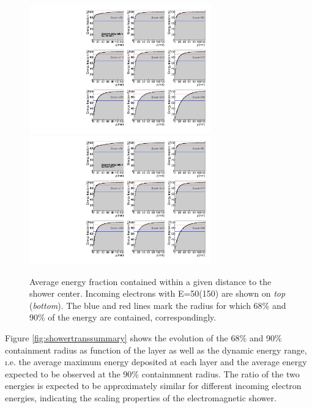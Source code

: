 \begin{figure}[h!]
  \begin{center}
    \includegraphics[width=0.7\textwidth]{figures/cfracsensorenhitsvsrE50}
    \includegraphics[width=0.7\textwidth]{figures/cfracsensorenhitsvsrE150}
    \caption{Average energy fraction contained within a given distance
      to the shower center. Incoming electrons
      with E=50\GeV (150\GeV) are shown on {\em top} ({\em bottom}).
      The blue and red lines mark the radius for which 68\% and 90\%
      of the energy are contained, correspondingly.
   }
    \label{fig:showertransavgenfrac}
  \end{center}
\end{figure}

Figure \ref{fig:showertranssummary} shows the evolution of the 68\%
and 90\% containment radius as function of the layer as well as the
dynamic energy range, \i.e. the average maximum energy deposited at
each layer and the average energy expected to be observed at the 90\%
containmnent radius.
The ratio of the two energies is expected to be approximately
similar for different incoming electron energies, indicating the
scaling properties of the electromagnetic shower.


